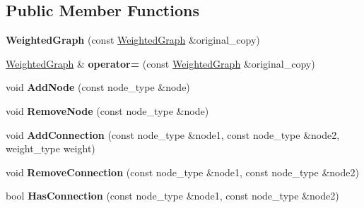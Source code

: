 \subsection*{Public Member Functions}
\begin{DoxyCompactItemize}
\item 
\hypertarget{class_data_structures_1_1_weighted_graph_ab697e42de015f040beafe130da1b76b5}{{\bfseries Weighted\-Graph} (const \hyperlink{class_data_structures_1_1_weighted_graph}{Weighted\-Graph} \&original\-\_\-copy)}\label{class_data_structures_1_1_weighted_graph_ab697e42de015f040beafe130da1b76b5}

\item 
\hypertarget{class_data_structures_1_1_weighted_graph_acbae80df6e3d282616e24b47b6fb10de}{\hyperlink{class_data_structures_1_1_weighted_graph}{Weighted\-Graph} \& {\bfseries operator=} (const \hyperlink{class_data_structures_1_1_weighted_graph}{Weighted\-Graph} \&original\-\_\-copy)}\label{class_data_structures_1_1_weighted_graph_acbae80df6e3d282616e24b47b6fb10de}

\item 
\hypertarget{class_data_structures_1_1_weighted_graph_ac2f5ba3910a6cfd634e6a33e8c68f89d}{void {\bfseries Add\-Node} (const node\-\_\-type \&node)}\label{class_data_structures_1_1_weighted_graph_ac2f5ba3910a6cfd634e6a33e8c68f89d}

\item 
\hypertarget{class_data_structures_1_1_weighted_graph_abf55d60605fb5ad3deca6fb7a1cf38ac}{void {\bfseries Remove\-Node} (const node\-\_\-type \&node)}\label{class_data_structures_1_1_weighted_graph_abf55d60605fb5ad3deca6fb7a1cf38ac}

\item 
\hypertarget{class_data_structures_1_1_weighted_graph_adc378f34b57faf0885d7edacea35d9d8}{void {\bfseries Add\-Connection} (const node\-\_\-type \&node1, const node\-\_\-type \&node2, weight\-\_\-type weight)}\label{class_data_structures_1_1_weighted_graph_adc378f34b57faf0885d7edacea35d9d8}

\item 
\hypertarget{class_data_structures_1_1_weighted_graph_a3e6a2a94aa9cf4c3c46922e51a9e8cc8}{void {\bfseries Remove\-Connection} (const node\-\_\-type \&node1, const node\-\_\-type \&node2)}\label{class_data_structures_1_1_weighted_graph_a3e6a2a94aa9cf4c3c46922e51a9e8cc8}

\item 
\hypertarget{class_data_structures_1_1_weighted_graph_a7b598441f4ed3ff1ffbda47d5e6f3153}{bool {\bfseries Has\-Connection} (const node\-\_\-type \&node1, const node\-\_\-type \&node2)}\label{class_data_structures_1_1_weighted_graph_a7b598441f4ed3ff1ffbda47d5e6f3153}


\end{DoxyCompactItemize}
